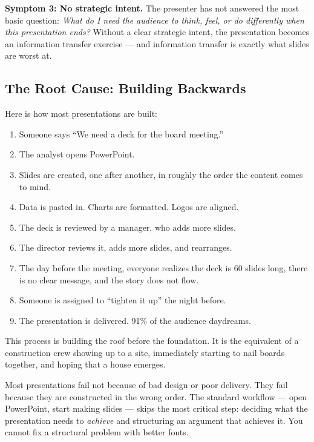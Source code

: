 \textbf{Symptom 3: No strategic intent.} The presenter has not answered the most basic question: \emph{What do I need the audience to think, feel, or do differently when this presentation ends?} Without a clear strategic intent, the presentation becomes an information transfer exercise --- and information transfer is exactly what slides are worst at.

\subsection{The Root Cause: Building Backwards}

Here is how most presentations are built:

\begin{enumerate}
  \item Someone says ``We need a deck for the board meeting.''
  \item The analyst opens PowerPoint.
  \item Slides are created, one after another, in roughly the order the content comes to mind.
  \item Data is pasted in. Charts are formatted. Logos are aligned.
  \item The deck is reviewed by a manager, who adds more slides.
  \item The director reviews it, adds more slides, and rearranges.
  \item The day before the meeting, everyone realizes the deck is 60 slides long, there is no clear message, and the story does not flow.
  \item Someone is assigned to ``tighten it up'' the night before.
  \item The presentation is delivered. 91\% of the audience daydreams.
\end{enumerate}

This process is building the roof before the foundation. It is the equivalent of a construction crew showing up to a site, immediately starting to nail boards together, and hoping that a house emerges.

\begin{insightbox}
Most presentations fail not because of bad design or poor delivery. They fail because they are constructed in the wrong order. The standard workflow --- open PowerPoint, start making slides --- skips the most critical step: deciding what the presentation needs to \emph{achieve} and structuring an argument that achieves it. You cannot fix a structural problem with better fonts.
\end{insightbox}

